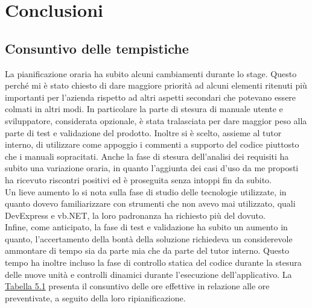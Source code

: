 
\chapter{Conclusioni}
\label{cap:conclusioni}
\section{Consuntivo delle tempistiche}
\label{tempistiche}
La pianificazione oraria ha subito alcuni cambiamenti durante lo stage. Questo perché mi è stato chiesto di dare maggiore priorità ad alcuni elementi ritenuti 
più importanti per l'azienda rispetto ad altri aspetti secondari che potevano essere colmati in altri modi. In particolare la parte di stesura di manuale utente e sviluppatore,
considerata opzionale, è stata tralasciata per dare maggior peso alla parte di test e validazione del prodotto. Inoltre si è scelto, assieme al tutor interno, di utilizzare
come appoggio i commenti a supporto del codice piuttosto che i manuali sopracitati. Anche la fase di stesura dell'analisi dei requisiti ha subito una variazione oraria, in quanto
l'aggiunta dei casi d'uso da me proposti ha ricevuto riscontri positivi ed è proseguita senza intoppi fin da subito.\\ Un lieve aumento lo si nota sulla fase di studio delle
tecnologie utilizzate, in quanto dovevo familiarizzare con strumenti che non avevo mai utilizzato, quali DevExpress e vb.NET, la loro padronanza ha richiesto più del dovuto.\\
Infine, come anticipato, la fase di test e validazione ha subito un aumento in quanto, l'accertamento della bontà della soluzione richiedeva un considerevole ammontare di tempo
sia da parte mia che da parte del tutor interno. Questo tempo ha inoltre incluso la fase di controllo statica del codice durante la stesura delle nuove unità e controlli dinamici
durante l'esecuzione dell'applicativo.
La \hyperref[effettive]{Tabella 5.1} presenta il consuntivo delle ore effettive in relazione alle ore preventivate, a seguito della loro ripianificazione.
\newpage



